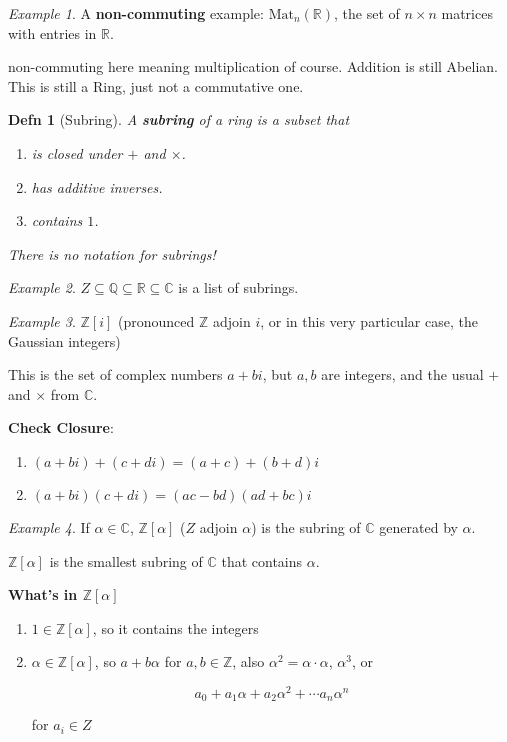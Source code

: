 \documentclass[12pt]{article}
\def\mat{\text{Mat}}
\def\Z{{\mathbb Z}}
\def\Q{{\mathbb Q}}
\def\R{{\mathbb R}}
\def\C{{\mathbb C}}
\newtheorem{definition}{Defn}
\theoremstyle{remark}
\theoremstyle{remark}
\theoremstyle{remark}
\newtheorem{example}{Example}
\theoremstyle{remark}
\theoremstyle{remark}
\begin{document}
\begin{example}
  A {\bf non-commuting} example: $\mat_n(\R)$, the set of $n \times n$ matrices
  with entries in $\R$.

  non-commuting here meaning multiplication of course. Addition is still
  Abelian. This is still a Ring, just not a commutative one.
\end{example}

\begin{definition}[Subring]
  A {\bf subring} of a ring is a subset that

  \begin{enumerate}
    \item is closed under $+$ and $\times$.
    \item has additive inverses.
    \item contains $1$.
  \end{enumerate}

  There is no notation for subrings!
\end{definition}

\begin{example}
  $Z \subseteq \Q \subseteq \R \subseteq \C$ is a list of subrings.
\end{example}

\begin{example}
  $\Z[i]$ (pronounced $\Z$ adjoin $i$, or in this very particular case, the
  Gaussian integers)

  This is the set of complex numbers $a + bi$, but $a, b$ are integers, and the
  usual $+$ and $\times$ from $\C$.

  {\bf Check Closure}:

  \begin{enumerate}
    \item $(a + bi) + (c + di) = (a + c) + (b + d)i$
    \item $(a + bi)(c + di) = (ac - bd)(ad + bc)i$
  \end{enumerate}
\end{example}

\begin{example}
  If $\alpha \in \C$, $\Z[\alpha]$ ($Z$ adjoin $\alpha$) is the subring of $\C$
  generated by $\alpha$.

  $\Z[\alpha]$ is the smallest subring of $\C$ that contains $\alpha$.

  {\bf What's in $\Z[\alpha]$}
  \begin{enumerate}
    \item $1 \in \Z[\alpha]$, so it contains the integers
    \item $\alpha \in \Z[\alpha]$, so $a + b\alpha$ for $a, b \in \Z$, also
      $\alpha^2 = \alpha \cdot \alpha$, $\alpha^3$, or

      \[
        a_0 + a_1 \alpha + a_2 \alpha^2 + \cdots a_n \alpha^n
      \]

      for $a_i \in Z$
  \end{enumerate}
\end{example}
\end{document}
